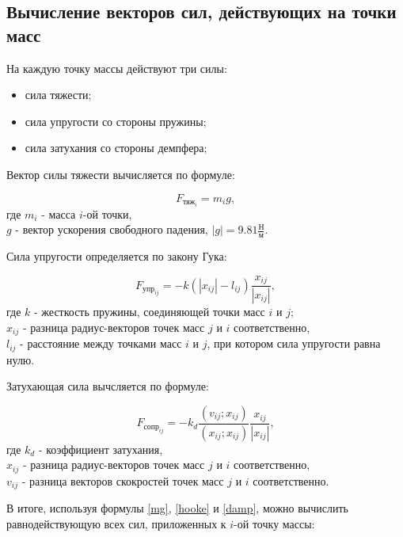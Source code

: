 \subsection{Вычисление векторов сил, действующих на точки масс}

На каждую точку массы действуют три силы:

\begin{itemize}
	\item сила тяжести;
	\item сила упругости со стороны пружины;
	\item сила затухания со стороны демпфера;
\end{itemize}

Вектор силы тяжести вычисляется по формуле:

\begin{equation}\label{mg}
	F_{\text{тяж}_i} = m_i g,
\end{equation}
где $m_i$ - масса $i$-ой точки,\\
\text{~~~~~} $g$ - вектор ускорения свободного падения, $|g| = 9.81 \frac{\text{Н}}{\text{м}}$.

Сила упругости определяется по закону Гука:

\begin{equation}\label{hooke}
	F_{\text{упр}_{ij}} = -k (|x_{ij}| - l_{ij}) \frac{x_{ij}}{|x_{ij}|},
\end{equation}
где $k$ - жесткость пружины, соединяющей точки масс $i$ и $j$;\\
\text{~~~~~}$x_{ij}$ - разница радиус-векторов точек масс $j$ и $i$ соответственно,\\
\text{~~~~~}$l_{ij}$ - расстояние между точками масс $i$ и $j$, при котором сила упругости равна нулю.

Затухающая сила вычсляется по формуле:

\begin{equation}\label{damp}
	F_{\text{сопр}_{ij}} = -k_d \frac{(v_{ij}; x_{ij})}{(x_{ij}; x_{ij})} \frac{x_{ij}}{|x_{ij}|},
\end{equation}
где $k_d$ - коэффициент затухания,\\
\text{~~~~~}$x_{ij}$ - разница радиус-векторов точек масс $j$ и $i$ соответственно,\\
\text{~~~~~}$v_{ij}$ - разница векторов скокростей точек масс $j$ и $i$ соответственно.

В итоге, используя формулы \eqref{mg}, \eqref{hooke} и \eqref{damp}, можно вычислить равнодействующую всех сил, приложенных к $i$-ой точку массы:


